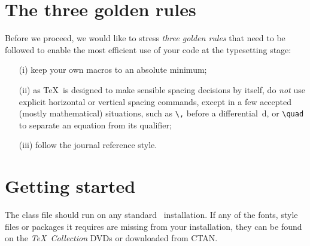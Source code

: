 \documentclass[Afour,sageh,times]{sagej}
\begin{document}
\section{The three golden rules}
Before we proceed, we would like to stress \textit{three golden
rules} that need to be followed to enable the most efficient use
of your code at the typesetting stage:
\begin{enumerate}
\item[(i)] keep your own macros to an absolute minimum;

\item[(ii)] as \TeX\ is designed to make sensible spacing
decisions by itself, do \textit{not} use explicit horizontal or
vertical spacing commands, except in a few accepted (mostly
mathematical) situations, such as \verb"\," before a
differential~d, or \verb"\quad" to separate an equation from its
qualifier;

\item[(iii)] follow the journal reference style.
\end{enumerate}

\section{Getting started} The \textsf{\journalclassshort} class file should run
on any standard \LaTeXe\ installation. If any of the fonts, style
files or packages it requires are missing from your installation,
they can be found on the \textit{\TeX\ Collection} DVDs or downloaded from
CTAN.
\end{document}

